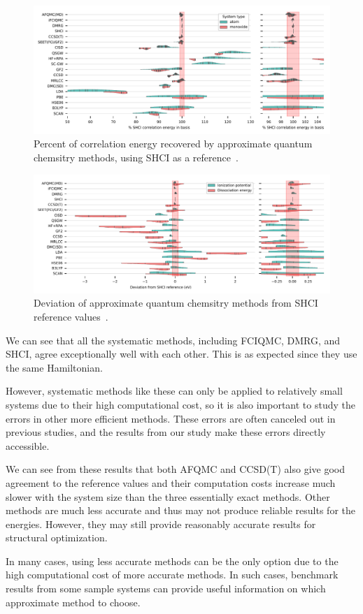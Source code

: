 \begin{figure}
  \begin{center}
  \includegraphics[width=\linewidth]{figs/correlation_energybar.pdf}
  \caption{Percent of correlation energy recovered by approximate quantum chemsitry methods, using SHCI as a reference~\cite{williams2019direct}.
}
  \label{fig:benchmark}
  \end{center}
\end{figure}

\begin{figure}
  \begin{center}
  \includegraphics[width=\linewidth]{figs/BE_IP_SHCI.pdf}
  \caption{Deviation of approximate quantum chemsitry methods from SHCI reference values~\cite{williams2019direct}.
}
  \label{fig:benchmark_be}
  \end{center}
\end{figure}

We can see that all the systematic methods, including FCIQMC, DMRG, and SHCI, agree exceptionally well with each other.
This is as expected since they use the same Hamiltonian.

However, systematic methods like these can only be applied to relatively small systems due to their high computational cost, so it is also important to study the errors in other more efficient methods.
These errors are often canceled out in previous studies, and the results from our study make these errors directly accessible.

We can see from these results that both AFQMC and CCSD(T) also give good agreement to the reference values and their computation costs increase much slower with the system size than the three essentially exact methods.
Other methods are much less accurate and thus may not produce reliable results for the energies.
However, they may still provide reasonably accurate results for structural optimization.

In many cases, using less accurate methods can be the only option due to the high computational cost of more accurate methods.
In such cases, benchmark results from some sample systems can provide useful information on which approximate method to choose.